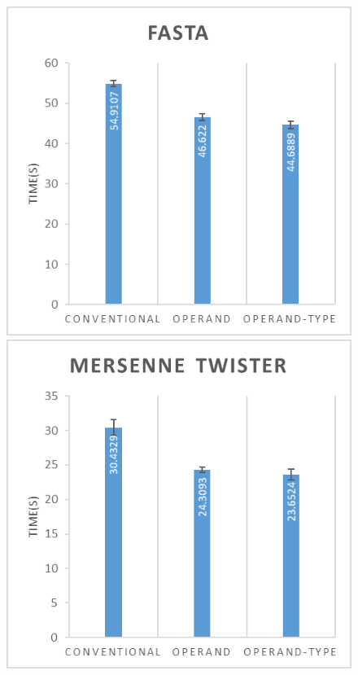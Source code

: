 \documentclass[english,a4paper,12pt]{report}
\begin{document}
\begin{figure}[!htb]
  \includegraphics{fasta.png}
  \includegraphics{mersenne.png}

\end{figure}
\end{document}
